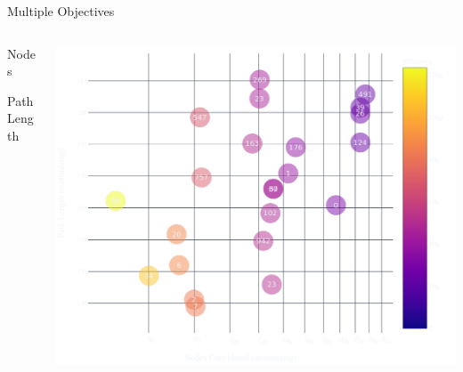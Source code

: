 \documentclass[aspectratio=169]{beamer}
\makeatletter
\renewcommand{\emph}[1]{{\Huge \color{pureminimalistic@text@red} #1}}
\makeatother
\begin{document}
\begin{frame}{{\color{pureminimalistic@text@white} Multiple Objectives}}
  \begin{columns}[T]
      \begin{column}{.4\linewidth}
          \begin{vfilleditems}
              \item \emph{Nodes}
              \item \emph{Path Length}
          \end{vfilleditems}
      \end{column}
      \begin{column}{.6\linewidth}
      \includegraphics[width=0.9\linewidth, keepaspectratio]{figures/total_overview.pdf}
      \end{column}
  \end{columns}
\end{frame}
\end{document}
